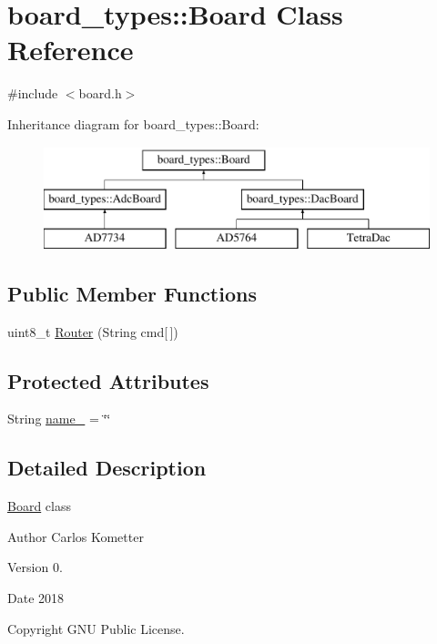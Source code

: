 \hypertarget{classboard__types_1_1Board}{}\section{board\+\_\+types\+:\+:Board Class Reference}
\label{classboard__types_1_1Board}


{\ttfamily \#include $<$board.\+h$>$}

Inheritance diagram for board\+\_\+types\+:\+:Board\+:\begin{figure}[H]
\begin{center}
\leavevmode
\includegraphics[height=3.000000cm]{classboard__types_1_1Board}
\end{center}
\end{figure}
\subsection*{Public Member Functions}
\begin{DoxyCompactItemize}
\item 
uint8\+\_\+t \mbox{\hyperlink{classboard__types_1_1Board_acd50f8de221d5b3fd978484efbf5198e}{Router}} (String cmd\mbox{[}$\,$\mbox{]})
\end{DoxyCompactItemize}
\subsection*{Protected Attributes}
\begin{DoxyCompactItemize}
\item 
String \mbox{\hyperlink{classboard__types_1_1Board_affe2fb94dacf42e9707eedce2ab1f955}{name\+\_\+}} = \char`\"{}\char`\"{}
\end{DoxyCompactItemize}


\subsection{Detailed Description}
\mbox{\hyperlink{classboard__types_1_1Board}{Board}} class \begin{DoxyAuthor}{Author}
Carlos Kometter 
\end{DoxyAuthor}
\begin{DoxyVersion}{Version}
0. 
\end{DoxyVersion}
\begin{DoxyDate}{Date}
2018 
\end{DoxyDate}
\begin{DoxyCopyright}{Copyright}
G\+NU Public License. 
\end{DoxyCopyright}


